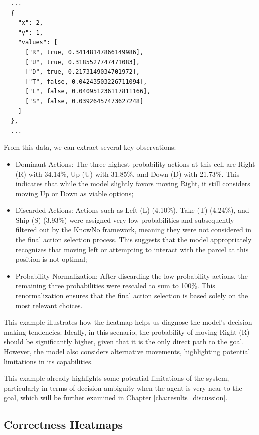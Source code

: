 \begin{verbatim}
  ...
  {
    "x": 2,
    "y": 1,
    "values": [
      ["R", true, 0.34148147866149986],
      ["U", true, 0.3185527747471083],
      ["D", true, 0.2173149034701972],
      ["T", false, 0.04243503226711094],
      ["L", false, 0.040951236117811166],
      ["S", false, 0.03926457473627248]
    ]
  },
  ...
\end{verbatim}

From this data, we can extract several key observations:
\begin{itemize}
  \item Dominant Actions: The three highest-probability actions at this cell are
    Right (R) with 34.14\%, Up (U) with 31.85\%, and Down (D) with 21.73\%. This
    indicates that while the model slightly favors moving Right, it still considers
    moving Up or Down as viable options;

  \item Discarded Actions: Actions such as Left (L) (4.10\%), Take (T) (4.24\%),
    and Ship (S) (3.93\%) were assigned very low probabilities and subsequently filtered
    out by the KnowNo framework, meaning they were not considered in the final
    action selection process. This suggests that the model appropriately recognizes
    that moving left or attempting to interact with the parcel at this position is
    not optimal;

  \item Probability Normalization: After discarding the low-probability actions,
    the remaining three probabilities were rescaled to sum to 100\%. This renormalization
    ensures that the final action selection is based solely on the most relevant
    choices.
\end{itemize}

This example illustrates how the heatmap helps us diagnose the model’s decision-making
tendencies. Ideally, in this scenario, the probability of moving Right (R) should
be significantly higher, given that it is the only direct path to the goal. However,
the model also considers alternative movements, highlighting potential limitations
in its capabilities.

This example already highlights some potential limitations of the system,
particularly in terms of decision ambiguity when the agent is very near to the
goal, which will be further examined in Chapter \ref{cha:results_discussion}.

\subsection{Correctness Heatmaps}
\label{sub:correctness_heatmaps}

